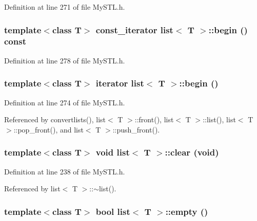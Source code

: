 Definition at line 271 of file MySTL.h.

\subsubsection[{begin}]{\setlength{\rightskip}{0pt plus 5cm}template$<$class T$>$ {\bf const\_\-iterator} {\bf list}$<$ T $>$::begin () const}\label{classlist_a82d02ae5c829958abc9782d99794c86b}


Definition at line 278 of file MySTL.h.

\subsubsection[{begin}]{\setlength{\rightskip}{0pt plus 5cm}template$<$class T$>$ {\bf iterator} {\bf list}$<$ T $>$::begin ()}\label{classlist_a254beaef0a23d76871212c8af2f6118c}


Definition at line 274 of file MySTL.h.



Referenced by convertlists(), list$<$ T $>$::front(), list$<$ T $>$::list(), list$<$ T $>$::pop\_\-front(), and list$<$ T $>$::push\_\-front().

\subsubsection[{clear}]{\setlength{\rightskip}{0pt plus 5cm}template$<$class T$>$ void {\bf list}$<$ T $>$::clear (void)}\label{classlist_a64e8edd9de8e5b2648cc4e993ae48a29}


Definition at line 238 of file MySTL.h.



Referenced by list$<$ T $>$::$\sim$list().

\subsubsection[{empty}]{\setlength{\rightskip}{0pt plus 5cm}template$<$class T$>$ bool {\bf list}$<$ T $>$::empty ()}\label{classlist_a4aabf08487cbc621c2c45b6f545d6420}



